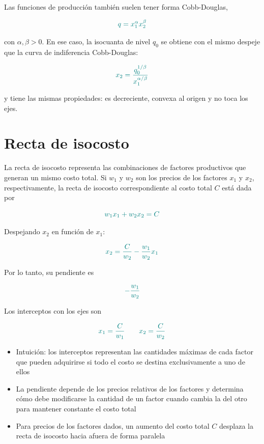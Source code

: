 \documentclass{article}
\begin{document}
Las funciones de producción también suelen tener forma {\color{teal}Cobb-Douglas},

\[
{\color{teal}
q=x_1^\alpha x_2^\beta
}
\]

con \(\alpha,\beta>0\). En ese caso, la isocuanta de nivel \(q_0\) se obtiene con el mismo despeje que la curva de indiferencia Cobb-Douglas:

\[
{\color{teal}
x_2=
\frac{q_0^{1/\beta}}{x_1^{\alpha/\beta}}
}
\]

y tiene las mismas propiedades: es decreciente, convexa al origen y no toca los ejes.


\section*{Recta de isocosto}

La {\color{teal}recta de isocosto} representa las combinaciones de factores productivos que generan un mismo {\color{teal}costo total}. Si \(w_1\) y \(w_2\) son los precios de los factores \(x_1\) y \(x_2\), respectivamente, la recta de isocosto correspondiente al costo total \(C\) está dada por

\[
{\color{teal}
w_1x_1+w_2x_2=C
}
\]

Despejando \(x_2\) en función de \(x_1\):

\[
{\color{teal}
x_2=\frac{C}{w_2}-\frac{w_1}{w_2}x_1
}
\]

Por lo tanto, su pendiente es

\[
{\color{teal}
-\frac{w_1}{w_2}
}
\]

Los interceptos con los ejes son

\[
{\color{teal}
x_1=\frac{C}{w_1}
\qquad
x_2=\frac{C}{w_2}
}
\]

\begin{itemize}
    \item Intuición: los interceptos representan las cantidades máximas de cada factor que pueden adquirirse si todo el costo se destina exclusivamente a uno de ellos

    \item La pendiente depende de los {\color{teal}precios relativos de los factores} y determina cómo debe modificarse la cantidad de un factor cuando cambia la del otro para mantener constante el costo total

    \item Para precios de los factores dados, un aumento del costo total \(C\) desplaza la recta de isocosto hacia afuera de forma paralela
\end{itemize}
\end{document}
